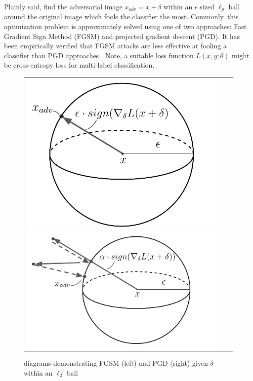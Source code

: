 \documentclass{article}
\theoremstyle{definition}
\begin{document}
Plainly said, find the adversarial image $x_{adv} = x + \delta$ within an $\epsilon$ sized $\ell_p$ ball around the
original image which fools the classifier the most. Commonly, this optimization problem is approximately solved using
one of two approaches: Fast Gradient Sign Method (FGSM) and projected gradient descent (PGD). It has been empirically
verified that FGSM attacks are less effective at fooling a classifier than PGD approaches \cite{madry}. Note, a suitable
loss function $L(x,y;\theta)$ might be cross-entropy loss for multi-label classification.


\begin{figure}[H]
    \centering
    \begin{tabular}{ccc}
    \includegraphics[scale=0.2]{./FGSM.png}
    \includegraphics[scale=0.2]{./PGD.png}
    \end{tabular}
    \caption{diagrams demonstrating FGSM (left) and PGD (right) given $\delta$ within an $\ell_2$ ball}
    \label{fig:PGD}
\end{figure}
\end{document}
